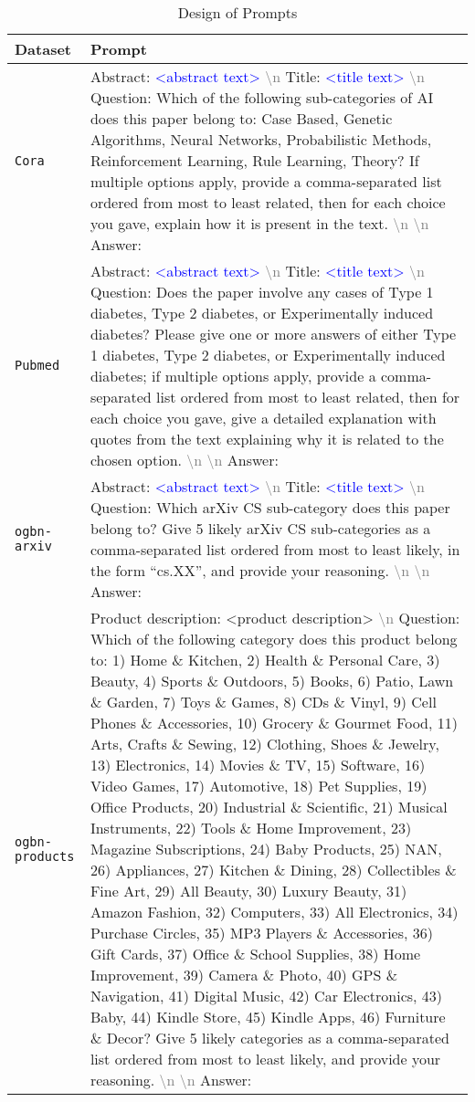 \documentclass{article}
\newcommand{\promptfield}[1]{\textcolor{blue}{<#1>}}
\newcommand{\newl}{\textcolor{gray}{\textbackslash n }}
\begin{document}
\begin{table}[!ht]
\small
    \centering
\caption{Design of Prompts}
    \label{tab: prompt}
    \begin{tabularx}{\textwidth}{lX}
    \toprule
         Dataset & Prompt\\
         \midrule
         \texttt{Cora}
         &Abstract: \promptfield{abstract text} \newl Title: \promptfield{title text} \newl Question: Which of the following sub-categories of AI does this paper belong to: Case Based, Genetic Algorithms, Neural Networks, Probabilistic Methods, Reinforcement Learning, Rule Learning, Theory? If multiple options apply, provide a comma-separated list ordered from most to least related, then for each choice you gave, explain how it is present in the text. \newl \newl Answer: \\
         \midrule
         \texttt{Pubmed}
         &Abstract: \promptfield{abstract text} \newl Title: \promptfield{title text} \newl Question: Does the paper involve any cases of Type 1 diabetes, Type 2 diabetes, or Experimentally induced diabetes? Please give one or more answers of either Type 1 diabetes, Type 2 diabetes, or Experimentally induced diabetes; if multiple options apply, provide a comma-separated list ordered from most to least related, then for each choice you gave, give a detailed explanation with quotes from the text explaining why it is related to the chosen option. \newl \newl Answer:\\
         \midrule
         \texttt{ogbn-arxiv}
         &{Abstract: \promptfield{abstract text} \newl Title: \promptfield{title text} \newl Question: Which arXiv CS sub-category does this paper belong to? Give 5 likely arXiv CS sub-categories as a comma-separated list ordered from most to least likely, in the form ``cs.XX'', and provide your reasoning. \newl \newl Answer:}\\
         \midrule
         \texttt{ogbn-products}
         & Product description: {\color{blue}<product description>} \newl Question: Which of the following category does this product belong to: 1) Home \& Kitchen, 2) Health \& Personal Care, 3) Beauty, 4) Sports \& Outdoors, 5) Books, 6) Patio, Lawn \& Garden, 7) Toys \& Games, 8) CDs \& Vinyl, 9) Cell Phones \& Accessories, 10) Grocery \& Gourmet Food, 11) Arts, Crafts \& Sewing, 12) Clothing, Shoes \& Jewelry, 13) Electronics, 14) Movies \& TV, 15) Software, 16) Video Games, 17) Automotive, 18) Pet Supplies, 19) Office Products, 20) Industrial \& Scientific, 21) Musical Instruments, 22) Tools \& Home Improvement, 23) Magazine Subscriptions, 24) Baby Products, 25) NAN, 26) Appliances, 27) Kitchen \& Dining, 28) Collectibles \& Fine Art, 29) All Beauty, 30) Luxury Beauty, 31) Amazon Fashion, 32) Computers, 33) All Electronics, 34) Purchase Circles, 35) MP3 Players \& Accessories, 36) Gift Cards, 37) Office \& School Supplies, 38) Home Improvement, 39) Camera \& Photo, 40) GPS \& Navigation, 41) Digital Music, 42) Car Electronics, 43) Baby, 44) Kindle Store, 45) Kindle Apps, 46) Furniture \& Decor? Give 5 likely categories as a comma-separated list ordered from most to least likely, and provide your reasoning. \newl\newl Answer: 

\end{tabularx}
\end{table}
\end{document}
